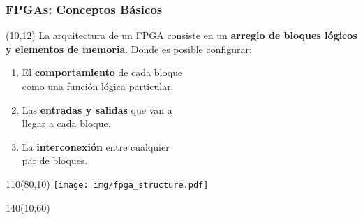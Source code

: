 \documentclass[aspectratio=169]{beamer}
\begin{document}
\begin{frame}[fragile,t]
    \frametitle{FPGAs: Conceptos Básicos}
    \begin{textblock}{70}(10,12)
    La arquitectura de un FPGA consiste en un \textbf{arreglo de bloques lógicos y elementos de memoria}.
    Donde es posible configurar:
    \small
    \begin{enumerate}
        \item<2-> El \textcolor{naranjauca}{\textbf{comportamiento}} de cada bloque\\ como una función lógica particular.
        \item<3-> Las \textcolor{naranjauca}{\textbf{entradas y salidas}} que van a\\ llegar a cada bloque.
        \item<4-> La \textcolor{naranjauca}{\textbf{interconexión}} entre cualquier\\ par de bloques.
    \end{enumerate}
    \end{textblock}
    \begin{textblock}{110}(80,10)
    \texttt{[image: img/fpga\_structure.pdf]}  
    \end{textblock}
    \begin{textblock}{140}(10,60) \small
    \end{textblock}
\end{frame}
\end{document}
